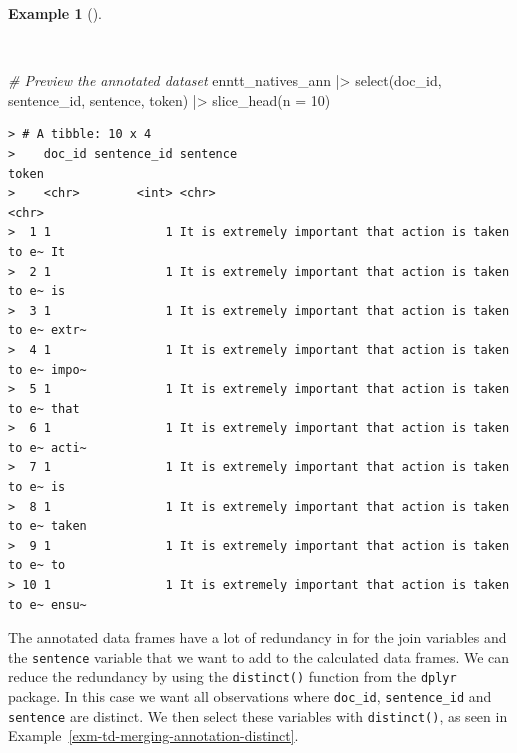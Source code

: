 \documentclass[
  letterpaper,
  DIV=11,
  numbers=noendperiod]{scrreport}
\newenvironment{Shaded}{\begin{snugshade}}{\end{snugshade}}
\newcommand{\AttributeTok}[1]{\textcolor[rgb]{0.00,0.00,0.00}{#1}}
\newcommand{\CommentTok}[1]{\textcolor[rgb]{0.00,0.00,0.00}{\textit{#1}}}
\newcommand{\DecValTok}[1]{\textcolor[rgb]{0.00,0.00,0.00}{#1}}
\newcommand{\FunctionTok}[1]{\textcolor[rgb]{0.00,0.00,0.00}{#1}}
\newcommand{\NormalTok}[1]{\textcolor[rgb]{0.00,0.00,0.00}{#1}}
\newcommand{\SpecialCharTok}[1]{\textcolor[rgb]{0.00,0.00,0.00}{#1}}
\theoremstyle{definition}
\newtheorem{example}{Example}[chapter]
\theoremstyle{remark}
\begin{document}
\begin{example}[]\protect\hypertarget{exm-td-merging-join-prepped-syn-comp-ann}{}\label{exm-td-merging-join-prepped-syn-comp-ann}

~

\begin{Shaded}
\begin{Highlighting}[]
\CommentTok{\# Preview the annotated dataset}
\NormalTok{enntt\_natives\_ann }\SpecialCharTok{|\textgreater{}} 
  \FunctionTok{select}\NormalTok{(doc\_id, sentence\_id, sentence, token) }\SpecialCharTok{|\textgreater{}}
  \FunctionTok{slice\_head}\NormalTok{(}\AttributeTok{n =} \DecValTok{10}\NormalTok{)}
\end{Highlighting}
\end{Shaded}

\begin{verbatim}
> # A tibble: 10 x 4
>    doc_id sentence_id sentence                                             token
>    <chr>        <int> <chr>                                                <chr>
>  1 1                1 It is extremely important that action is taken to e~ It   
>  2 1                1 It is extremely important that action is taken to e~ is   
>  3 1                1 It is extremely important that action is taken to e~ extr~
>  4 1                1 It is extremely important that action is taken to e~ impo~
>  5 1                1 It is extremely important that action is taken to e~ that 
>  6 1                1 It is extremely important that action is taken to e~ acti~
>  7 1                1 It is extremely important that action is taken to e~ is   
>  8 1                1 It is extremely important that action is taken to e~ taken
>  9 1                1 It is extremely important that action is taken to e~ to   
> 10 1                1 It is extremely important that action is taken to e~ ensu~
\end{verbatim}

\end{example}

The annotated data frames have a lot of redundancy in for the join
variables and the \texttt{sentence} variable that we want to add to the
calculated data frames. We can reduce the redundancy by using the
\texttt{distinct()} function from the \texttt{dplyr} package. In this
case we want all observations where \texttt{doc\_id},
\texttt{sentence\_id} and \texttt{sentence} are distinct. We then select
these variables with \texttt{distinct()}, as seen in
Example~\ref{exm-td-merging-annotation-distinct}.
\end{document}

